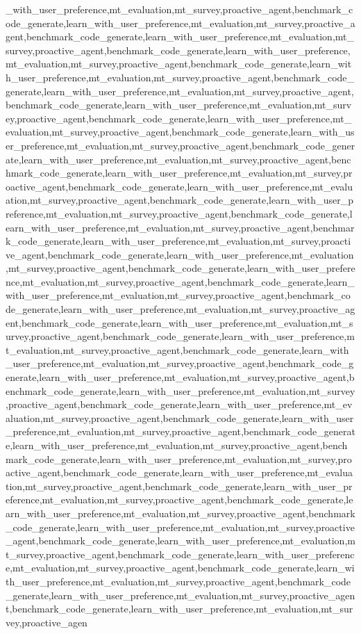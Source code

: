 _with_user_preference,mt_evaluation,mt_survey,proactive_agent,benchmark_code_generate,learn_with_user_preference,mt_evaluation,mt_survey,proactive_agent,benchmark_code_generate,learn_with_user_preference,mt_evaluation,mt_survey,proactive_agent,benchmark_code_generate,learn_with_user_preference,mt_evaluation,mt_survey,proactive_agent,benchmark_code_generate,learn_with_user_preference,mt_evaluation,mt_survey,proactive_agent,benchmark_code_generate,learn_with_user_preference,mt_evaluation,mt_survey,proactive_agent,benchmark_code_generate,learn_with_user_preference,mt_evaluation,mt_survey,proactive_agent,benchmark_code_generate,learn_with_user_preference,mt_evaluation,mt_survey,proactive_agent,benchmark_code_generate,learn_with_user_preference,mt_evaluation,mt_survey,proactive_agent,benchmark_code_generate,learn_with_user_preference,mt_evaluation,mt_survey,proactive_agent,benchmark_code_generate,learn_with_user_preference,mt_evaluation,mt_survey,proactive_agent,benchmark_code_generate,learn_with_user_preference,mt_evaluation,mt_survey,proactive_agent,benchmark_code_generate,learn_with_user_preference,mt_evaluation,mt_survey,proactive_agent,benchmark_code_generate,learn_with_user_preference,mt_evaluation,mt_survey,proactive_agent,benchmark_code_generate,learn_with_user_preference,mt_evaluation,mt_survey,proactive_agent,benchmark_code_generate,learn_with_user_preference,mt_evaluation,mt_survey,proactive_agent,benchmark_code_generate,learn_with_user_preference,mt_evaluation,mt_survey,proactive_agent,benchmark_code_generate,learn_with_user_preference,mt_evaluation,mt_survey,proactive_agent,benchmark_code_generate,learn_with_user_preference,mt_evaluation,mt_survey,proactive_agent,benchmark_code_generate,learn_with_user_preference,mt_evaluation,mt_survey,proactive_agent,benchmark_code_generate,learn_with_user_preference,mt_evaluation,mt_survey,proactive_agent,benchmark_code_generate,learn_with_user_preference,mt_evaluation,mt_survey,proactive_agent,benchmark_code_generate,learn_with_user_preference,mt_evaluation,mt_survey,proactive_agent,benchmark_code_generate,learn_with_user_preference,mt_evaluation,mt_survey,proactive_agent,benchmark_code_generate,learn_with_user_preference,mt_evaluation,mt_survey,proactive_agent,benchmark_code_generate,learn_with_user_preference,mt_evaluation,mt_survey,proactive_agent,benchmark_code_generate,learn_with_user_preference,mt_evaluation,mt_survey,proactive_agent,benchmark_code_generate,learn_with_user_preference,mt_evaluation,mt_survey,proactive_agent,benchmark_code_generate,learn_with_user_preference,mt_evaluation,mt_survey,proactive_agent,benchmark_code_generate,learn_with_user_preference,mt_evaluation,mt_survey,proactive_agent,benchmark_code_generate,learn_with_user_preference,mt_evaluation,mt_survey,proactive_agent,benchmark_code_generate,learn_with_user_preference,mt_evaluation,mt_survey,proactive_agent,benchmark_code_generate,learn_with_user_preference,mt_evaluation,mt_survey,proactive_agent,benchmark_code_generate,learn_with_user_preference,mt_evaluation,mt_survey,proactive_agent,benchmark_code_generate,learn_with_user_preference,mt_evaluation,mt_survey,proactive_agent,benchmark_code_generate,learn_with_user_preference,mt_evaluation,mt_survey,proactive_agent,benchmark_code_generate,learn_with_user_preference,mt_evaluation,mt_survey,proactive_agen